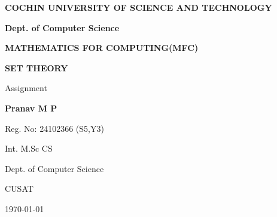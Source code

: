 \documentclass[12pt,a4paper]{article}
\begin{document}

\begin{titlepage}
\centering

\vspace*{1.2cm}

{\Large \textbf{COCHIN UNIVERSITY OF SCIENCE AND TECHNOLOGY}}

\vspace{0.4cm}

{\large \textbf{Dept. of Computer Science}}

\vspace{1.5cm}

{\Large \textbf{MATHEMATICS FOR COMPUTING(MFC)}}

\vspace{1cm}

{\Huge \textbf{SET THEORY}}

\vspace{1.2cm}

{\large Assignment}

\vfill

\begin{center}
\textbf{Pranav M P}

\vspace{0.25cm}

Reg. No: 24102366 (S5,Y3)

\vspace{0.25cm}

Int. M.Sc CS

\vspace{0.25cm}

Dept. of Computer Science

\vspace{0.25cm}

CUSAT
\end{center}

\vfill

{\large \today}

\end{titlepage}


\tableofcontents

\newpage

\end{document}
